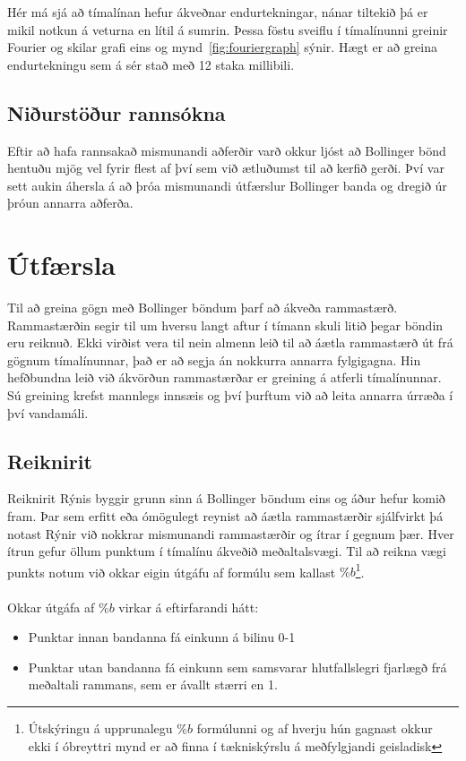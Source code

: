 \documentclass{article}
\begin{document}
Hér má sjá að tímalínan hefur ákveðnar endurtekningar, nánar tiltekið þá er mikil notkun á veturna en lítil á sumrin.
Þessa föstu sveiflu í tímalínunni greinir Fourier og skilar grafi eins og mynd~\ref{fig:fouriergraph} sýnir. 
Hægt er að greina endurtekningu sem á sér stað með 12 staka millibili.

\subsection{Niðurstöður rannsókna}
Eftir að hafa rannsakað mismunandi aðferðir varð okkur ljóst að Bollinger bönd hentuðu
mjög vel fyrir flest af því sem við ætluðumst til að kerfið gerði.
Því var sett aukin áhersla á að þróa mismunandi útfærslur Bollinger banda og
dregið úr þróun annarra aðferða. 
\newpage
\section{Útfærsla}
\label{sec:imp_our}
Til að greina gögn með Bollinger böndum þarf að ákveða rammastærð.
Rammastærðin segir til um hversu langt aftur í tímann skuli litið þegar böndin eru reiknuð.
Ekki virðist vera til nein almenn leið til að áætla rammastærð út frá gögnum tímalínunnar, það er að segja án 
nokkurra annarra fylgigagna.
Hin hefðbundna leið við ákvörðun rammastærðar er greining á atferli tímalínunnar. Sú greining krefst mannlegs innsæis og því 
þurftum við að leita annarra úrræða í því vandamáli.

\subsection{Reiknirit}
\label{sec:imp_algorithm}
Reiknirit Rýnis byggir grunn sinn á Bollinger böndum eins og áður hefur komið fram.
Þar sem erfitt eða ómögulegt reynist að áætla rammastærðir sjálfvirkt þá notast Rýnir við nokkrar mismunandi
rammastærðir og ítrar í gegnum þær. Hver ítrun gefur öllum punktum í tímalínu ákveðið meðaltalsvægi. Til að reikna
vægi punkts notum við okkar eigin útgáfu af formúlu sem kallast 
$\%b$\footnote[1]{Útskýringu á upprunalegu $\%b$ formúlunni og af hverju hún gagnast okkur ekki í óbreyttri mynd er að finna í tækniskýrslu á meðfylgjandi geisladisk}. 
\\ \hfil
\\ \hfil
Okkar útgáfa af $\%b$ virkar á eftirfarandi hátt:
\begin{itemize}
  \item Punktar innan bandanna fá einkunn á bilinu 0-1
  \item Punktar utan bandanna fá einkunn sem samsvarar hlutfallslegri fjarlægð frá meðaltali rammans, sem er ávallt stærri en 1.
\end{itemize}
\end{document}
